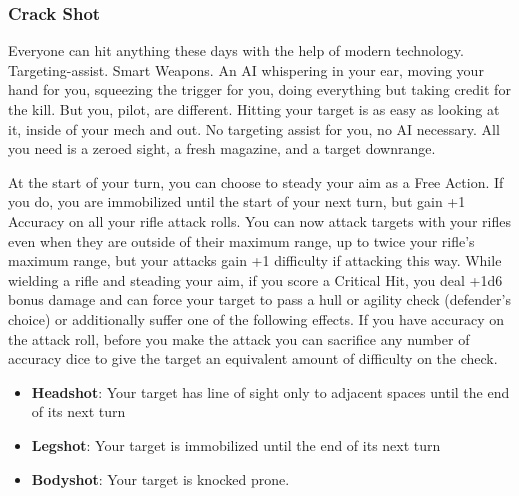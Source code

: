 \subsubsection{Crack Shot}

\begin{talent}
{Everyone can hit anything these days with the help of modern technology. Targeting-assist. Smart Weapons. An AI whispering in your ear, moving your hand for you, squeezing the trigger for you, doing everything but taking credit for the kill. But you, pilot, are different. Hitting your target is as easy as looking at it, inside of your mech and out. No targeting assist for you, no AI necessary. All you need is a zeroed sight, a fresh magazine, and a target downrange.}

At the start of your turn, you can choose to steady your aim as a Free Action. If you do, you are immobilized until the start of your next turn, but gain +1 Accuracy on all your rifle attack rolls.
You can now attack targets with your rifles even when they are outside of their maximum range, up to twice your rifle's maximum range, but your attacks gain +1 difficulty if attacking this way. 
While wielding a rifle and steading your aim, if you score a Critical Hit, you deal +1d6 bonus damage and can force your target to pass a hull or agility check (defender's choice) or additionally suffer one of the following effects. If you have accuracy on the attack roll, before you make the attack you can sacrifice any number of accuracy dice to give the target an equivalent amount of difficulty on the check.
\begin{itemize}
\item \textbf{Headshot}: Your target has line of sight only to adjacent spaces until the end of its next turn 
\item \textbf{Legshot}: Your target is immobilized until the end of its next turn 
\item \textbf{Bodyshot}: Your target is knocked prone.
\end{itemize}
\end{talent}
